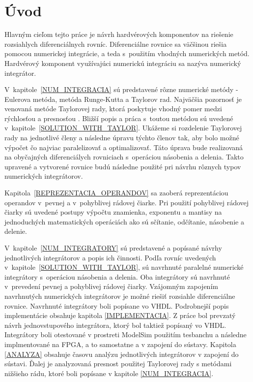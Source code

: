 
\chapter{Úvod}
Hlavným cieľom tejto práce je návrh hardvérových komponentov na riešenie rozsiahlych diferenciálnych rovníc. Diferenciálne rovnice sa väčšinou riešia pomocou numerickej integrácie, a teda s~použitím vhodných numerických metód. Hardvérový komponent využívajúci numerickú integráciu sa nazýva numerický integrátor.

V~kapitole~\ref{NUM_INTEGRACIA} sú predstavené rôzne numerické metódy - Eulerova metóda, metóda Runge-Kutta a Taylorov rad. Najväčšia pozornosť je venovaná metóde Taylorovej rady, ktorá poskytuje vhodný pomer medzi rýchlosťou a presnosťou \cite{KunovskyH}. Bližší popis a práca s~toutou metódou sú uvedené v~kapitole~\ref{SOLUTION_WITH_TAYLOR}. Ukážeme si rozdelenie Taylorovej rady na jednotlivé členy a následne úpravu týchto členov tak, aby bolo možné výpočet čo najviac paralelizovať a optimalizovať. Táto úprava bude realizovaná na obyčajných diferenciálych rovniciach s~operáciou násobenia a delenia. Takto upravené a vytvorené rovnice budú následne použité pri návrhu rôznych typov numerických integrátorov.

Kapitola~\ref{REPREZENTACIA_OPERANDOV} sa zaoberá reprezentáciou operandov v~pevnej a v~pohyblivej rádovej čiarke. Pri použití pohyblivej rádovej čiarky sú uvedené postupy výpočtu znamienka, exponentu a mantisy na jednoduchých matematických operáciách ako sú sčítanie, odčítanie, násobenie a delenie.

V~kapitole~\ref{NUM_INTEGRATORY} sú predstavené a popísané návrhy jednotlivých integrátorov a popis ich činnosti. Podľa rovníc uvedených v~kapitole~\ref{SOLUTION_WITH_TAYLOR}, sú navrhnuté paralelné numerické integrátory s~operáciou násobenia a delenia. Oba integrátory sú navrhnuté v~prevedení pevnej a pohyblivej rádovej čiarky. Vzájomným zapojením navrhnutých numerických integrátorov je možné riešiť rozsiahle diferenciálne rovnice.
Navrhnuté integrátory boli popísane vo VHDL. Podrobnejší popis implementácie obsahuje kapitola \ref{IMPLEMENTACIA}.  Z práce \cite{OpalkaDP} bol prevzatý návrh jednovstupového integrátora, ktorý bol taktiež popísaný vo VHDL. Integrátory boli otestované v prostreti ModelSim použitím tesbanchu a následne implmentované na FPGA, a to samostatne a v zapojení do sústavy.
Kapitola \ref{ANALYZA} obsahuje časovu analýzu jednotlivých integrátorov v zapojení do sústavi. Ďalej je analyzovaná presnost použitej Taylorovej rady s metódami nižšieho rádu, ktoré boli popísane v kapitole \ref{NUM_INTEGRACIA}.


